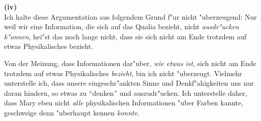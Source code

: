 \documentclass[a4paper]{article}
\begin{document}
\begin{prooftree}
\end{prooftree}


\noindent\textbf{(iv)}\\
\noindent Ich halte diese Argumentation aus folgendem Grund f"ur nicht "uberzeugend: Nur weil wir eine Information, die sich auf das Qualia bezieht, nicht \emph{ausdr"ucken k"onnen}, hei"st das noch lange nicht, dass sie sich nicht am Ende trotzdem auf etwas Physikalisches bezieht. 

Von der Meinung, dass Informationen dar"uber, \emph{wie etwas ist}, sich nicht am Ende trotzdem auf etwas Physikalisches \emph{bezieht}, bin ich nicht "uberzeugt. Vielmehr unterstelle ich, dass unsere eingeschr"ankten Sinne und Denkf"ahigkeiten uns nur daran hindern, so etwas zu "`denken"' und auszudr"ucken. Ich unterstelle daher, dass Mary eben nicht \emph{alle} physikalischen Informationen "uber Farben kannte, geschweige denn "uberhaupt kennen \emph{konnte}.
\end{document}
